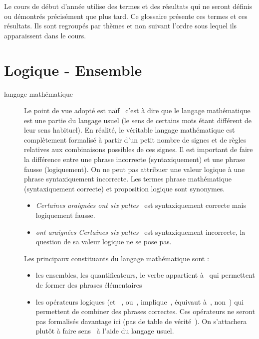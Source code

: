 

Le cours de début d'année utilise des termes et des résultats qui ne seront définis ou démontrés précisément que plus tard. Ce glossaire présente ces termes et ces résultats. Ils sont regroupés par thèmes et non suivant l'ordre sous lequel ils apparaissent dans le cours.
\section{Logique - Ensemble}
\begin{description}
 \item[langage mathématique] Le point de vue adopté est \og naïf\fg~ c'est à dire que le langage mathématique est une partie du langage usuel (le sens de certains mots étant différent de leur sens habituel). En réalité, le véritable langage mathématique est complètement formalisé à partir d'un petit nombre de signes et de règles relatives aux combinaisons possibles de ces signes. Il est important de faire la différence entre une phrase incorrecte (syntaxiquement) et une phrase fausse (logiquement). On ne peut pas attribuer une valeur logique à une phrase syntaxiquement incorrecte. Les termes \og phrase mathématique\fg~  (syntaxiquement correcte) et proposition logique sont synonymes.
\begin{itemize}
 \item \og\emph{Certaines araignées ont six pattes}\fg~ est syntaxiquement correcte mais logiquement fausse.
 \item \og\emph{ont araignées Certaines six  pattes}\fg~ est syntaxiquement incorrecte, la question de sa valeur logique ne se pose pas.
\end{itemize}
Les principaux constituants du langage mathématique sont :
\begin{itemize}
 \item les ensembles, les quantificateurs, le verbe \og appartient à\fg~ qui permettent de former des phrases élémentaires
 \item les opérateurs logiques (\og et\fg~ , \og ou\fg~, \og implique\fg~, \og équivaut à\fg~, \og non\fg~) qui permettent de combiner des phrases correctes. Ces opérateurs ne seront pas formalisés davantage ici (pas de \og table de vérité\fg~). On s'attachera plutôt à \og faire sens\fg~ à l'aide du langage usuel.
\end{itemize}


\end{description}
